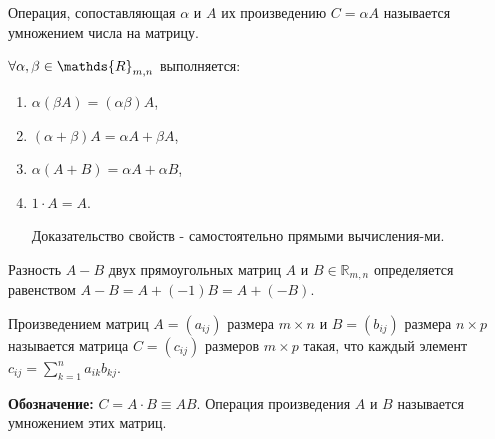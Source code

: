 \noindent Операция, сопоставляющая $\alpha$ и $A$ их произведению $C=\alpha A$ называется умножением числа на матрицу.

\begin{properties}
$\\ \forall \alpha, \beta \in \mathds{R}_{m,n}$ выполняется:
\begin{enumerate}
  \item $\alpha(\beta A) = (\alpha \beta)A$,
  \item $(\alpha + \beta)A = \alpha A + \beta A$,
  \item $\alpha(A+B)=\alpha A + \alpha B$,
  \item $1 \cdot A = A $.

  Доказательство свойств - самостоятельно прямыми вычисления-ми.
\end{enumerate}
\end{properties}
\begin{remark}
  Разность $A-B$ двух прямоугольных матриц $A$ и $B \in \mathds{R}_{m,n}$ определяется равенством $A-B=A+(-1)B=A+(-B)$.
\end{remark}
\begin{definition}
  Произведением матриц $A=(a_{ij})$ размера $m \times n$ и $B=(b_{ij})$ размера $n \times p$ называется матрица $C=(c_{ij})$ размеров $m \times p$ такая, что каждый элемент $c_{ij}= \sum \limits_{k=1}^n a_{ik}b_{kj}$.
\end{definition}
\noindent \textbf{Обозначение:} $C=A \cdot B \equiv AB$.
Операция произведения $A$ и $B$ называется умножением этих матриц.

